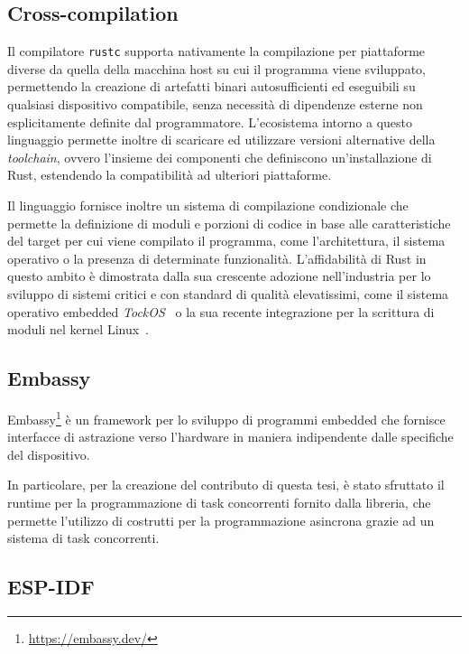 \subsection{Cross-compilation}
\label{ssec:cross-compilation}

Il compilatore \texttt{rustc} supporta nativamente la compilazione per piattaforme
diverse da quella della macchina host su cui il programma viene sviluppato,
permettendo la creazione di artefatti binari autosufficienti ed eseguibili su
qualsiasi dispositivo compatibile, senza necessità di dipendenze esterne non
esplicitamente definite dal programmatore.
L'ecosistema intorno a questo linguaggio permette inoltre di scaricare ed utilizzare
versioni alternative della \emph{toolchain}, ovvero l'insieme dei componenti che
definiscono un'installazione di Rust, estendendo la compatibilità ad ulteriori
piattaforme.

Il linguaggio fornisce inoltre un sistema di compilazione condizionale che permette
la definizione di moduli e porzioni di codice in base alle caratteristiche del
target per cui viene compilato il programma, come l'architettura, il sistema operativo
o la presenza di determinate funzionalità.
L'affidabilità di Rust in questo ambito è dimostrata dalla sua crescente
adozione nell'industria per lo sviluppo di sistemi critici e con standard di qualità
elevatissimi, come il sistema operativo embedded \emph{TockOS}~\cite{10.1145/3731569.3764828}
o la sua recente integrazione per la scrittura di moduli nel kernel Linux~\cite{10.1145/3674805.3690756}.

\subsection{Embassy}
\label{sec:embassy}

Embassy\footnote{\url{https://embassy.dev/}} è un framework per lo sviluppo di
programmi embedded che fornisce interfacce di astrazione verso l'hardware in maniera
indipendente dalle specifiche del dispositivo.

In particolare, per la creazione del contributo di questa tesi, è stato sfruttato
il runtime per la programmazione di task concorrenti fornito dalla libreria,
che permette l'utilizzo di costrutti per la programmazione asincrona grazie ad
un sistema di task concorrenti.

\subsection{ESP-IDF}
\label{ssec:esp-idf}

